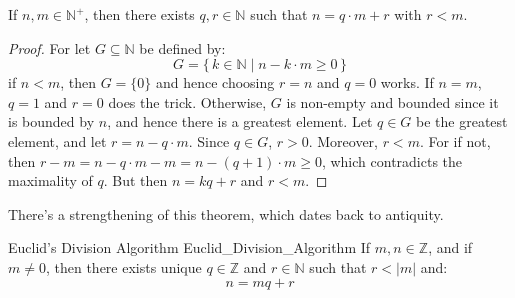 \documentclass{article}                                                        %
\begin{document}
            \begin{theorem}
                \label{thm:Weak_Euc_Division_Alg}%
                If $n,m\in\mathbb{N}^{+}$, then there exists $q,r\in\mathbb{N}$
                such that $n=q\cdot{m}+r$ with $r<m$.
            \end{theorem}
            \begin{proof}
                For let $G\subseteq\mathbb{N}$ be defined by:
                \begin{equation}
                    G=\{\,k\in\mathbb{N}\;|\;n-k\cdot{m}\geq{0}\,\}
                \end{equation}
                if $n<m$, then $G=\{0\}$ and hence choosing $r=n$ and $q=0$
                works. If $n=m$, $q=1$ and $r=0$ does the trick. Otherwise, $G$
                is non-empty and bounded since it is bounded by $n$, and hence
                there is a greatest element. Let $q\in{G}$ be the greatest
                element, and let $r=n-q\cdot{m}$. Since $q\in{G}$, $r>0$.
                Moreover, $r<m$. For if not, then
                $r-m=n-q\cdot{m}-m=n-(q+1)\cdot{m}\geq{0}$, which contradicts
                the maximality of $q$. But then $n=kq+r$ and $r<m$.
            \end{proof}
            There's a strengthening of this theorem, which dates back to
            antiquity.
            \begin{ftheorem}{Euclid's Division Algorithm}
                            {Euclid_Division_Algorithm}
                If $m,n\in\mathbb{Z}$, and if $m\ne{0}$, then there exists
                unique $q\in\mathbb{Z}$ and $r\in\mathbb{N}$ such that $r<|m|$
                and:
                \begin{equation*}
                    n=mq+r
                \end{equation*}
            \end{ftheorem}
\end{document}
